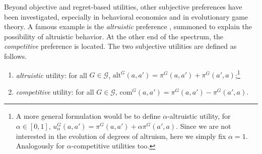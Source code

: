 \documentclass[fleqn,reqno,12pt]{article}
\theoremstyle{Satz}
\theoremstyle{Bsp}
\renewcommand{\footnotesize}{\normalsize}
\begin{document}
Beyond objective and regret-based utilities, other subjective preferences have been investigated, especially in behavioral economics and in evolutionary game theory. A
famous example is the \textit{altruistic} preference \citep[e.g.,][]{Beck76,BestGuth98}, summoned to
explain the possibility of altruistic behavior. At the other end of the spectrum, the \emph{competitive}
preference is located. The two subjective utilities are defined as follows.
\begin{enumerate}
\item \textit{altruistic} utility: for all $G \in \mathcal{G}$, $\text{alt}^G(a,a') = \pi^G(a,a') + \pi^G(a',a)$;\footnote{A
    more general formulation would be to define $ \alpha$-altruistic utility, for
    $\alpha \in [0,1]$,
    $ u^G_\alpha(a, a')=\pi^G(a,a') + \alpha \pi^G(a',a)$. Since we are not
    interested in the evolution of degrees of altruism, here we simply fix $ \alpha = 1 $. Analogously for $\alpha$-competitive utilities too.}
\item \textit{competitive} utility: for all $G \in \mathcal{G}$, $\text{com}^G(a,a') = \pi^G(a,a') - \pi^G(a',a)$.
\end{enumerate}


\begin{table}[]
\centering
\footnotesize
{}                  
\caption{Average evolutionary fitness from Monte Carlo simulations of 100,000 symmetric $2 \times 2$ games.}
\label{tab:ExpectedFitness_2x2_Full}        
\end{table}   
 
\end{document}
